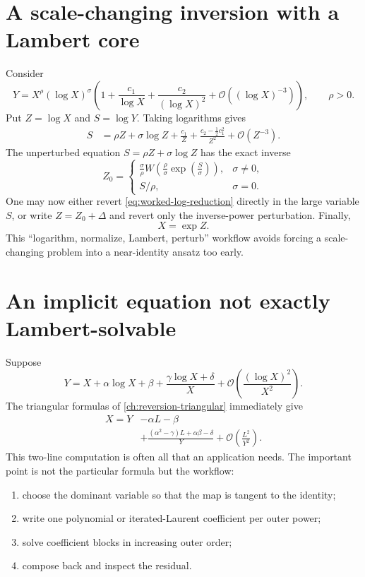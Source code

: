 \documentclass[11pt,oneside]{book}
\theoremstyle{definition}
\theoremstyle{remark}
\newcommand{\bigO}{\mathcal O}
\begin{document}
\section{A scale-changing inversion with a Lambert core}
Consider
\begin{equation}\label{eq:worked-scale-change}
 Y=X^\rho(\log X)^\sigma
 \left(1+\frac{c_1}{\log X}
       +\frac{c_2}{(\log X)^2}
       +\bigO((\log X)^{-3})\right),
 \qquad \rho>0.
\end{equation}
Put $Z=\log X$ and $S=\log Y$. Taking logarithms gives
\begin{align}
 S
 &=\rho Z+\sigma\log Z
   +\frac{c_1}{Z}
   +\frac{c_2-\frac12c_1^2}{Z^2}
   +\bigO(Z^{-3}).
 \label{eq:worked-log-reduction}
\end{align}
The unperturbed equation $S=\rho Z+\sigma\log Z$ has the exact inverse
\[
 Z_0=
 \begin{cases}
 \displaystyle
 \frac{\sigma}{\rho}
 W\!\left(\frac{\rho}{\sigma}
          \exp\!\left(\frac S\sigma\right)\right),
 &\sigma\ne0,\\[1.2em]
 S/\rho,&\sigma=0.
 \end{cases}
\]
One may now either revert \eqref{eq:worked-log-reduction} directly in the
large variable $S$, or write $Z=Z_0+\Delta$ and revert only the inverse-power
perturbation. Finally,
\[
 X=\exp Z.
\]
This ``logarithm, normalize, Lambert, perturb'' workflow avoids forcing a
scale-changing problem into a near-identity ansatz too early.

\section{An implicit equation not exactly Lambert-solvable}
Suppose
\begin{equation}\label{eq:worked-implicit}
 Y=X+\alpha\log X+\beta
 +\frac{\gamma\log X+\delta}{X}
 +\bigO\!\left(\frac{(\log X)^2}{X^2}\right).
\end{equation}
The triangular formulas of \cref{ch:reversion-triangular} immediately give
\begin{align}
 X=Y&-\alpha L-\beta\\
 &+\frac{(\alpha^2-\gamma)L+\alpha\beta-\delta}{Y}
 +\bigO\!\left(\frac{L^2}{Y^2}\right).
 \label{eq:worked-implicit-inverse}
\end{align}
This two-line computation is often all that an application needs. The
important point is not the particular formula but the workflow:
\begin{enumerate}
\item choose the dominant variable so that the map is tangent to the
      identity;
\item write one polynomial or iterated-Laurent coefficient per outer power;
\item solve coefficient blocks in increasing outer order;
\item compose back and inspect the residual.
\end{enumerate}
\end{document}
